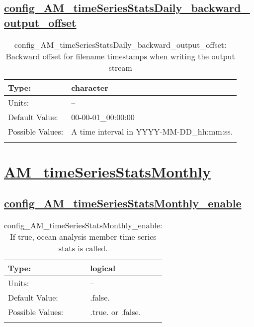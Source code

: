 \subsection[config\_AM\_timeSeriesStatsDaily\_backward\_output\_offset]{\hyperref[sec:nm_tab_AM_timeSeriesStatsDaily]{config\_AM\_timeSeriesStatsDaily\_backward\_output\_offset}}
\label{subsec:nm_sec_config_AM_timeSeriesStatsDaily_backward_output_offset}
\begin{center}
\begin{longtable}{| p{2.0in} || p{4.0in} |}
    \hline
    Type: & character \\
    \hline
    Units: & -- \\
    \hline
    Default Value: & 00-00-01\_00:00:00 \\
    \hline
    Possible Values: & A time interval in YYYY-MM-DD\_hh:mm:ss. \\
    \hline
    \caption{config\_AM\_timeSeriesStatsDaily\_backward\_output\_offset: Backward offset for filename timestamps when writing the output stream}
\end{longtable}
\end{center}
\section[AM\_timeSeriesStatsMonthly]{\hyperref[sec:nm_tab_AM_timeSeriesStatsMonthly]{AM\_timeSeriesStatsMonthly}}
\label{sec:nm_sec_AM_timeSeriesStatsMonthly}
\subsection[config\_AM\_timeSeriesStatsMonthly\_enable]{\hyperref[sec:nm_tab_AM_timeSeriesStatsMonthly]{config\_AM\_timeSeriesStatsMonthly\_enable}}
\label{subsec:nm_sec_config_AM_timeSeriesStatsMonthly_enable}
\begin{center}
\begin{longtable}{| p{2.0in} || p{4.0in} |}
    \hline
    Type: & logical \\
    \hline
    Units: & -- \\
    \hline
    Default Value: & .false. \\
    \hline
    Possible Values: & .true. or .false. \\
    \hline
    \caption{config\_AM\_timeSeriesStatsMonthly\_enable: If true, ocean analysis member time series stats is called.}
\end{longtable}
\end{center}
